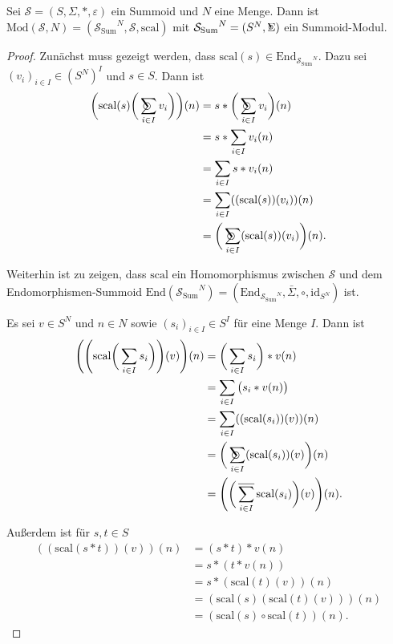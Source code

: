 \documentclass{article}
\DeclareMathOperator*{\Sigmacirc}{%
  \ThisStyle{\mathop{\ensurestackMath{\stackinset{c}{-0.75\LMpt}{c}{}{%
  \rotatebox[origin=lb]{-90}{$\circ$}}{\SavedStyle\Sigma}}}}}
\DeclareMathOperator*{\sumcirc}{%
  \ThisStyle{\mathop{\ensurestackMath{\stackinset{c}{-1.5\LMpt}{c}{}{%
  \rotatebox[origin=lb]{-90}{$\SavedStyle\scalerel*{\bm\Circle}{%
  i}$}}{\SavedStyle\sum}}}}}
\DeclareMathOperator*{\sumbar}{\overline{\sum}}
\begin{document}
\begin{theorem}
  Sei $\mathcal{S} = (S, \Sigma, \ast, \varepsilon)$ ein Summoid und $N$ eine Menge.
  Dann ist $\text{Mod}(\mathcal{S}, N) = ({\mathcal{S}_\text{Sum}}^N, \mathcal{S}, \text{scal})$
  mit ${\mathcal{S}_\text{Sum}}^N = (S^N, \Sigmacirc)$ ein Summoid-Modul.
\end{theorem}
\begin{proof}
  Zunächst muss gezeigt werden, dass $\text{scal}(s) \in \text{End}_{{\mathcal{S}_\text{Sum}}^N}$.
  Dazu sei $(v_i)_{i \in I} \in (S^N)^I$ und $s \in S$.
  Dann ist
  \begin{align*}
    \bigg( \text{scal}(s) \bigg(\sumcirc_{i \in I} v_i \bigg) \bigg)(n)
    &= s \ast \bigg( \sumcirc_{i \in I} v_i \bigg)(n) \\
    &= s \ast \sum_{i \in I} v_i(n) \\
    &= \sum_{i \in I} s \ast v_i(n) \\
    &= \sum_{i \in I} ((\text{scal}(s))(v_i))(n) \\
    &= \bigg( \sumcirc_{i \in I} (\text{scal}(s))(v_i) \bigg)(n).
  \end{align*}

  Weiterhin ist zu zeigen, dass $\text{scal}$ ein Homomorphismus 
  zwischen $\mathcal{S}$ und dem Endomorphismen-Summoid $\text{End}({\mathcal{S}_\text{Sum}}^N) = (\text{End}_{{\mathcal{S}_\text{Sum}}^N}, \bar\Sigma, \circ, \text{id}_{S^N})$ ist.

  Es sei $v \in S^N$ und $n \in N$ sowie $(s_i)_{i \in I} \in S^I$ für eine Menge $I$. 
  Dann ist
  \begin{align*}
    \Bigg(\Bigg(\text{scal}\bigg(\sum_{i \in I}s_i\bigg)\Bigg)(v)\Bigg)(n) 
    &= \bigg(\sum_{i \in I} s_i \bigg) \ast v(n) \\
    &= \sum_{i \in I} \big(s_i \ast v(n)\big) \\
    &= \sum_{i \in I} ((\text{scal}(s_i))(v))(n) \\
    &= \bigg(\sumcirc_{i \in I} (\text{scal}(s_i))(v)\bigg)(n) \\
    &= \Bigg(\bigg(\sumbar_{i \in I}\text{scal}(s_i)\bigg)(v)\Bigg)(n).
  \end{align*}

  Außerdem ist für $s, t \in S$
  \begin{align*}
    ((\text{scal}(s \ast t))(v))(n)
    &= (s \ast t) \ast v(n) \\
    &= s \ast (t \ast v(n)) \\
    &= s \ast (\text{scal}(t)(v))(n) \\
    &= (\text{scal}(s)(\text{scal}(t)(v)))(n) \\
    &= (\text{scal}(s) \circ \text{scal}(t))(n).
  \end{align*}
\end{proof}
\end{document}
